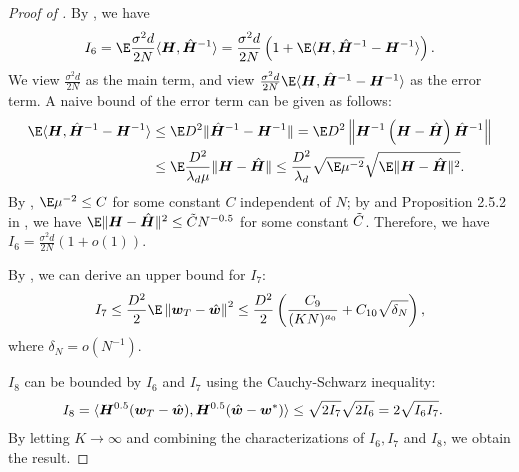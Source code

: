 \begin{proof}[Proof of ]
    By , we have \[I_6=\E\frac{\sigma^2d}{2N}\langle\mH, \hat{\mH}^{-1}\rangle=\frac{\sigma^2d}{2N}\left(1+\E\langle\mH,\hat{\mH}^{-1}-\mH^{-1}\rangle\right).\]
    We view $\frac{\sigma^2d}{2N}$ as the main term, and view $\frac{\sigma^2d}{2N}\E\langle\mH,\hat{\mH}^{-1}-\mH^{-1}\rangle$ as the error term. A naive bound of the error term can be given as follows:
    \begin{align*}
        \E\langle\mH,\hat{\mH}^{-1}-\mH^{-1}\rangle&\leq \E D^2\|\hat{\mH}^{-1}-\mH^{-1}\|=\E D^2\left\|\mH^{-1}\left(\mH-\hat{\mH}\right)\hat{\mH}^{-1}\right\| \\
        &\leq \E\frac{D^2}{\lambda_d\mu} \|\mH-\hat{\mH}\|\leq\frac{D^2}{\lambda_d}\sqrt{\E\mu^{-2}}\sqrt{\E\|\mH-\hat{\mH}\|^2}.
    \end{align*}
    By , $\E\mu^{-2}\leq C$ for some constant $C$ independent of $N$; by  and Proposition 2.5.2 in \citep{vershynin2018high}, we have $\E\|\mH-\hat{\mH}\|^2\leq \Tilde{C}N^{-0.5}$ for some constant $\Tilde{C}$. Therefore, we have $I_6=\frac{\sigma^2d}{2N}(1+o(1))$.
    
    By , we can derive an upper bound for $I_7$:
    \begin{align*}
        I_7\leq \frac{D^2}{2}\E\left\|\vw_T-\hat{\vw}\right\|^2\leq \frac{D^2}{2}\left(\frac{C_9}{(KN)^{a_0}}+C_{10}\sqrt{\delta_N}\right),
    \end{align*}
    where $\delta_N=o\left(N^{-1}\right)$.

    $I_8$ can be bounded by $I_6$ and $I_7$ using the Cauchy-Schwarz inequality:
    \begin{align*}
        I_8&=\langle{{\bm{H}}^{0.5}({\bm{w}}_T-\hat{{\bm{w}}}), {\bm{H}}^{0.5}(\hat{{\bm{w}}}-{\bm{w}}^*)}\rangle\leq\sqrt{2I_7}\sqrt{2I_6}=2\sqrt{I_6I_7}.
    \end{align*}
    By letting $K\to\infty$ and combining the characterizations of $I_6,I_7$ and $I_8$, we obtain the result.
\end{proof}
    
    

